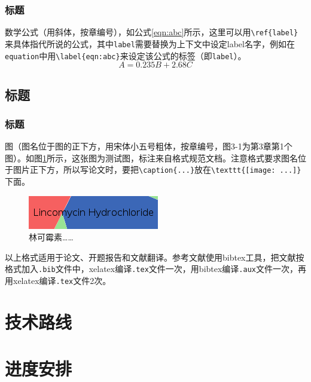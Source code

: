 \documentclass[opening]{ecustbachelorthesis}
\begin{document}
\subsubsection{标题}
数学公式（用斜体，按章编号），如公式\ref{eqn:abc}所示，这里可以用\verb$\ref{label}$来具体指代所说的公式，其中\verb$label$需要替换为上下文中设定label名字，例如在\verb$equation$中用\verb$\label{eqn:abc}$来设定该公式的标签（即\verb$label$）。
\begin{equation}
A=0.235B+2.68C \label{eqn:abc}
\end{equation}


\subsection{标题}
\subsubsection{标题}
图（图名位于图的正下方，用宋体小五号粗体，按章编号，图3-1为第3章第1个图）。如图\ref{fig:linc}所示，这张图为测试图，标注来自格式规范文档\cite{ecustjwc}。注意格式要求图名位于图片正下方，所以写论文时，要把\verb$\caption{...}$放在\verb$\texttt{[image: ...]}$下面。
\begin{figure}[!htbp]
  \centering
  \includegraphics{img1}
  \caption{林可霉素……}
  \label{fig:linc}
\end{figure}

以上格式适用于论文、开题报告和文献翻译。参考文献使用bibtex工具，把文献按格式加入\verb$.bib$文件中，xelatex编译\verb$.tex$文件一次，用bibtex编译\verb$.aux$文件一次，再用xelatex编译\verb$.tex$文件2次。
\section{技术路线}
\section{进度安排}


\end{document}
